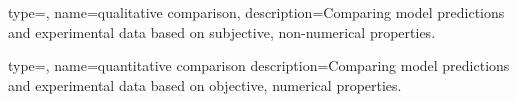 {
type=\thisgls,
name={qualitative comparison},
description={Comparing model predictions and experimental data based on subjective, non-numerical properties.}
}

{
type=\thisgls,
name={quantitative comparison}
description={Comparing model predictions and experimental data based on objective, numerical properties.}
}


